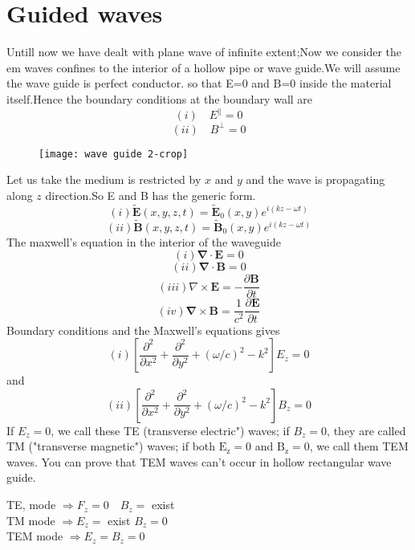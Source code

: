 \section{Guided waves}
Untill now we have dealt with plane wave of infinite extent;Now we consider the em waves confines to the interior of a hollow pipe or wave guide.We will assume the wave guide is perfect conductor. so that E=0 and B=0 inside the material itself.Hence the boundary conditions at the boundary wall are\\
$$ (i) \quad  E^{\parallel}=0$$ 
$$ (ii) \quad B^{\perp}=0$$
\begin{figure}[H]
	\centering
	\texttt{[image: wave guide 2-crop]}
	\caption{}
	\label{}
\end{figure}
Let us take the medium is restricted by $x$ and $y$ and the wave is propagating along $z$ direction.So E and B has the generic form.\\
$$(i) \tilde{\mathbf{E}}(x, y, z, t)=\tilde{\mathbf{E}}_{0}(x, y) e^{i(k z-\omega t)}$$
$$(ii) \tilde{\mathbf{B}}(x, y, z, t)=\tilde{\mathbf{B}}_{0}(x, y) e^{i(k z-\omega t)}$$
The maxwell's equation in the interior of the waveguide\\
$$(i) \boldsymbol{\nabla} \cdot \mathbf{E}=0$$
$$(ii)\boldsymbol{\nabla} \cdot \mathbf{B}=0$$
$$(iii) \nabla \times \mathbf{E}=-\frac{\partial \mathbf{B}}{\partial t}$$
$$(iv) \boldsymbol{\nabla} \times \mathbf{B}=\frac{1}{c^{2}} \frac{\partial \mathbf{E}}{\partial t}$$
 Boundary conditions and the Maxwell's equations gives \\
$$ (i) \left[\frac{\partial^{2}}{\partial x^{2}}+\frac{\partial^{2}}{\partial y^{2}}+(\omega / c)^{2}-k^{2}\right] E_{z}=0$$ and\\
$$ (ii) \left[\frac{\partial^{2}}{\partial x^{2}}+\frac{\partial^{2}}{\partial y^{2}}+(\omega / c)^{2}-k^{2}\right] B_{z}=0$$
If $E_{z}=0$, we call these TE (transverse electric") waves; if $B_{z}=0$, they are called TM ("transverse magnetic") waves; if both $\mathrm{E}_{\mathrm{z}}=0$ and $\mathrm{B}_{\mathrm{z}}=0$, we call them TEM waves. You can prove that TEM waves can't occur in hollow rectangular wave guide.\\
\begin{center}
 TE, mode $\Rightarrow F_{z}=0 \quad B_{z}=$ exist\\
$\mathrm{TM}$ mode $\Rightarrow E_{z}=$ exist $B_{z}=0$\\
TEM mode $\Rightarrow E_{z}=B_{z}=0$\\	
\end{center}
